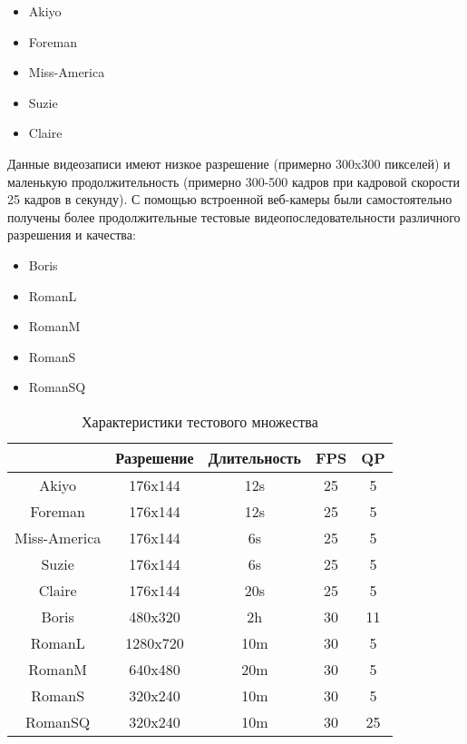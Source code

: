 \begin{itemize}
    \item Akiyo
    \item Foreman
    \item Miss-America
    \item Suzie
    \item Claire
\end{itemize}

Данные видеозаписи имеют низкое разрешение (примерно 300x300 пикселей)
и маленькую продолжительность (примерно 300-500 кадров при кадровой
скорости 25 кадров в секунду). С помощью встроенной веб-камеры были
самостоятельно получены более продолжительные тестовые видеопоследовательности
различного разрешения и качества:

\begin{itemize}
    \item Boris
    \item RomanL
    \item RomanM
    \item RomanS
    \item RomanSQ
\end{itemize}

\begin{table}[ht]
\caption{Характеристики тестового множества}
\centering
\begin{tabular}{| c | c | c | c | c |}
\hline
              & Разрешение & Длительность & FPS & QP \\ \hline
Akiyo         & 176x144    & 12s          & 25  & 5  \\ \hline
Foreman       & 176x144    & 12s          & 25  & 5  \\ \hline
Miss-America  & 176x144    & 6s           & 25  & 5  \\ \hline
Suzie         & 176x144    & 6s           & 25  & 5  \\ \hline
Claire        & 176x144    & 20s          & 25  & 5  \\ \hline
Boris         & 480x320    & 2h           & 30  & 11 \\ \hline
RomanL        & 1280x720   & 10m          & 30  & 5  \\ \hline
RomanM        & 640x480    & 20m          & 30  & 5  \\ \hline
RomanS        & 320x240    & 10m          & 30  & 5  \\ \hline
RomanSQ       & 320x240    & 10m          & 30  & 25 \\ \hline
\end{tabular}
\label{tab:videos}
\end{table}

